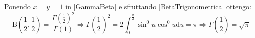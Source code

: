 \begin{remark}
	Ponendo $x=y=1$ in \cref{GammaBeta} e sfruttando \cref{BetaTrigonometrica} ottengo:
	\begin{equation*}
		\mathrm{B}\left(\frac12,\frac12\right)=\dfrac{\Gamma\left(\frac12\right)^2}{\Gamma(1)}\Rightarrow 
		\Gamma\left(\frac12\right)^2=2\int_0^{\frac{\pi}2}\sin^0u\cos^0u\mathrm{d}u=\pi\Rightarrow \Gamma\left(\frac12\right)=\sqrt{\pi}
	\end{equation*}
\end{remark}